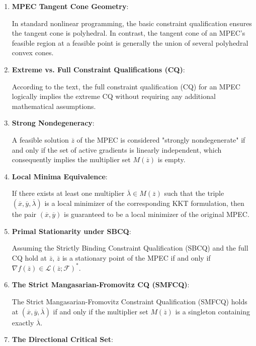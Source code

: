 \documentclass[pdflatex,sn-mathphys-num]{sn-jnl}%
\theoremstyle{definition}
\begin{document}
\begin{enumerate}[label=(\roman*)]
\item \textbf{MPEC Tangent Cone Geometry}:
    
In standard nonlinear programming, the basic constraint qualification ensures the tangent cone is polyhedral. In contrast, the tangent cone of an MPEC’s feasible region at a feasible point is generally the union of several polyhedral convex cones.

\item \textbf{Extreme vs. Full Constraint Qualifications (CQ)}:

According to the text, the full constraint qualification (CQ) for an MPEC logically implies the extreme CQ without requiring any additional mathematical assumptions.

\item \textbf{Strong Nondegeneracy}:

A feasible solution $\overline{z}$ of the MPEC is considered "strongly nondegenerate" if and only if the set of active gradients is linearly independent, which consequently implies the multiplier set $M(\overline{z})$ is empty.

\item \textbf{Local Minima Equivalence}:

If there exists at least one multiplier $\overline{\lambda} \in M(\overline{z})$ such that the triple $(\overline{x},\overline{y},\overline{\lambda})$ is a local minimizer of the corresponding KKT formulation, then the pair $(\overline{x},\overline{y})$ is guaranteed to be a local minimizer of the original MPEC.

\item \textbf{Primal Stationarity under SBCQ}:

Assuming the Strictly Binding Constraint Qualification (SBCQ) and the full CQ hold at $\overline{z}$, $\overline{z}$ is a stationary point of the MPEC if and only if $\nabla f(\overline{z}) \in \mathcal{L}(\overline{z};\mathcal{F})^*$.

\item \textbf{The Strict Mangasarian-Fromovitz CQ (SMFCQ)}:

The Strict Mangasarian-Fromovitz Constraint Qualification (SMFCQ) holds at $(\overline{x},\overline{y},\overline{\lambda})$ if and only if the multiplier set $M(\overline{z})$ is a singleton containing exactly $\overline{\lambda}$.

\item \textbf{The Directional Critical Set}:


\end{enumerate}
\end{document}
